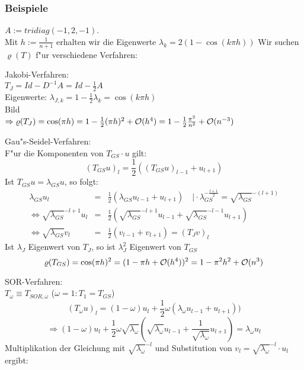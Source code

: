 \documentclass{scrartcl}
\begin{document}
\subsubsection{Beispiele}

$A := tridiag(-1,2,-1)$. \\
Mit $h := \frac{1}{n+1}$ erhalten wir die Eigenwerte $\lambda_k = 2(1 - \cos(k \pi h))$
Wir suchen $\varrho(T)$ f"ur verschiedene Verfahren:
\begin{1aufz}
\item Jakobi-Verfahren: \\
$T_J = Id - D^{-1}A = Id - \frac{1}{2}A$ \\
Eigenwerte: $\lambda_{J,k} = 1 - \frac{1}{2} \lambda_k = \cos (k \pi h)$ \\
Bild \\
$\Rightarrow \varrho(T_J) = \cos (\pi h) = 1 - \frac{1}{2} (\pi h)^2 + \mathcal{O}(h^4) = 1 - \frac{1}{2} \frac{\pi^2}{n^2} + \mathcal{O}(n^{-3})$ \\
\item Gau"s-Seidel-Verfahren: \\
F"ur die Komponenten von $T_{GS} \cdot u$ gilt: \\
$$(T_{GS} u)_l = \frac{1}{2} ((T_{GS} u)_{l-1}+ u_{l+1})$$
Ist $T_{GS} u = \lambda_{GS} u$, so folgt:
\begin{eqnarray*}
\lambda_{GS} u_l & = & \frac{1}{2} (\lambda_{GS} u_{l-1} + u_{l+1}) \quad \vert \cdot \lambda_{GS}^{-\frac{l+1}{2}} = \sqrt{\lambda_{GS}}^{-(l+1)} \\
\Leftrightarrow \sqrt{\lambda_{GS}}^{-l+1} u_l & = & \frac{1}{2} ( \sqrt{\lambda_{GS}}^{-l+1} u_{l-1} + \sqrt{\lambda_{GS}}^{-l-1} u_{l+1} ) \\
\Leftrightarrow \sqrt{\lambda_{GS}} v_l & = & \frac{1}{2} (v_{l-1} + v_{l+1}) = (T_J v)_l
\end{eqnarray*}
Ist $\lambda_J$ Eigenwert von $T_J$, so ist $\lambda_J^2$ Eigenwert von $T_{GS}$ \\
$$ \varrho(T_{GS}) = \cos(\pi h)^2 = (1 - \pi h + \mathcal{O}(h^4))^2 = 1- \pi^2 h^2 + \mathcal{O} (n^3)$$
\item SOR-Verfahren: \\
$T_\omega \equiv T_{SOR, \omega}$ ($\omega = 1: T_1 = T_{GS}$) 
$$(T_\omega u)_l = (1 - \omega) u_l + \frac{1}{2} \omega (\lambda_\omega u_{l-1} + u_{l+1}) )$$
$$\Rightarrow (1- \omega) u_l + \frac{1}{2} \omega \sqrt{\lambda_\omega} ( \sqrt{ \lambda_\omega} u_{l-1} + \frac{1}{\sqrt{\lambda_\omega}} u_{l+1} ) = \lambda_\omega u_l$$ 
Multiplikation der Gleichung mit $\sqrt{ \lambda_\omega}^{-l}$ und Substitution von $v_l = \sqrt{\lambda_\omega}^{-l} \cdot u_l$ ergibt:

\end{1aufz}
\end{document}
